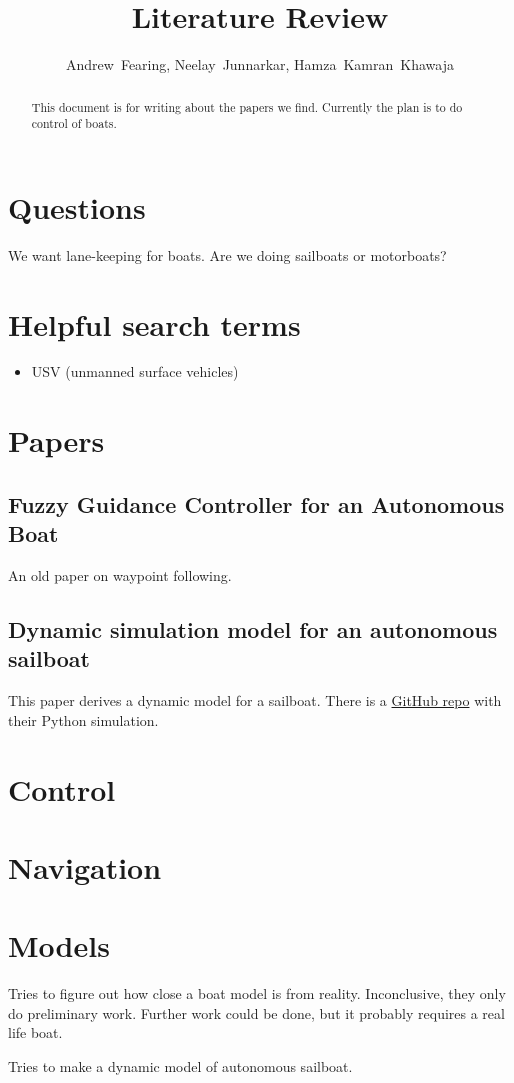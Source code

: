 \documentclass[conference]{IEEEtran}
\begin{document}
\title{Literature Review}
\author{Andrew~Fearing, Neelay~Junnarkar,  Hamza~Kamran~Khawaja}
\maketitle

\begin{abstract}
This document is for writing about the papers we find. Currently the plan is to do control of boats.
\end{abstract}

\section{Questions}
We want lane-keeping for boats. Are we doing sailboats or motorboats?
\section{Helpful search terms}
\begin{itemize}
    \item USV (unmanned surface vehicles)
    
\end{itemize}

\section{Papers}
\subsection{Fuzzy Guidance Controller for an Autonomous Boat}
\cite{Vaneck1997} An old paper on waypoint following.


\subsection{Dynamic simulation model for an autonomous sailboat}
\cite{Buehler2018} This paper derives a dynamic model for a sailboat. There is a \href{https://github.com/simonkohaut/stda-sailboat-simulator/tree/master/src}{GitHub repo} with their Python simulation.


\section{Control}

\section{Navigation}

\section{Models}
\cite{Huang2017} Tries to figure out how close a boat model is from reality. Inconclusive, they only do preliminary work. Further work could be done, but it probably requires a real life boat.

\cite{Setiawan2020} Tries to make a dynamic model of autonomous sailboat.


\end{document}
